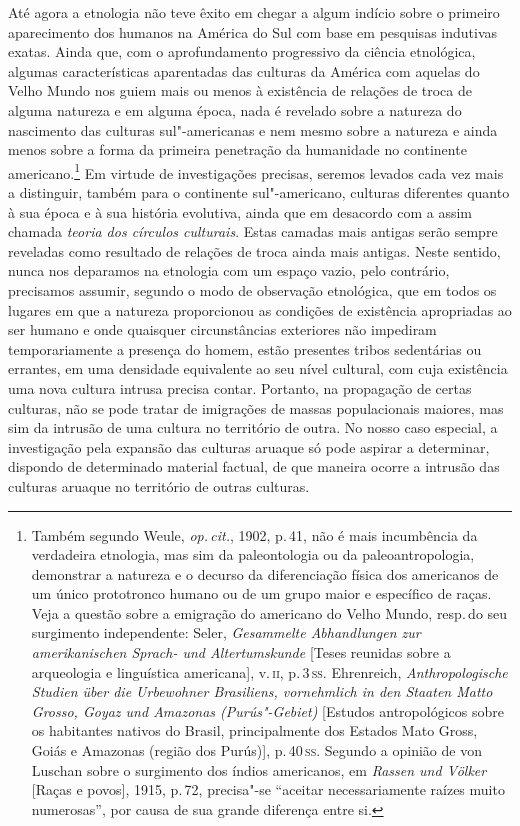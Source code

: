 Até agora a etnologia não teve êxito em chegar a algum indício sobre o
primeiro aparecimento dos humanos na América do Sul com base em
pesquisas indutivas exatas. Ainda que, com o aprofundamento progressivo
da ciência etnológica, algumas características aparentadas das culturas
da América com aquelas do Velho Mundo nos guiem mais ou menos à
existência de relações de troca de alguma natureza e em alguma época,
nada é revelado sobre a natureza do nascimento das
culturas sul"-americanas e nem mesmo sobre a natureza e ainda menos sobre
a forma da primeira penetração da humanidade no continente
americano.\footnote{Também segundo Weule, \textit{op.\,cit.}, 1902, p.\,41, não é mais incumbência
  da verdadeira etnologia, mas sim da paleontologia ou da
  paleoantropologia, demonstrar a natureza e o decurso da diferenciação
  física dos americanos de um único prototronco
  humano ou de um grupo maior e específico de raças.
  Veja a questão sobre a emigração do americano do Velho Mundo, resp.\,do
  seu surgimento independente: Seler, \textit{Gesammelte Abhandlungen zur
  amerikanischen Sprach- und Altertumskunde} {[}Teses reunidas sobre a
  arqueologia e linguística americana{]}, v.\,\textsc{ii}, p.\,3\,\textsc{ss}. Ehrenreich,
  \textit{Anthropologische Studien über die Urbewohner Brasiliens,
  vornehmlich in den Staaten Matto Grosso, Goyaz und Amazonas
  (Purús"-Gebiet)} {[}Estudos antropológicos sobre os habitantes nativos
  do Brasil, principalmente dos Estados Mato Gross, Goiás e Amazonas
  (região dos Purús){]}, p.\,40\,\textsc{ss}. Segundo a opinião de von Luschan
  sobre o surgimento dos índios americanos, em \textit{Rassen und Völker} {[}Raças e povos{]},
  1915, p.\,72, precisa"-se ``aceitar
  necessariamente raízes muito numerosas'', por causa de sua grande
  diferença entre si.} Em virtude de investigações precisas, seremos levados
cada vez mais a distinguir, também para o continente sul"-americano,
culturas diferentes quanto à sua época e à sua história evolutiva, ainda que em desacordo 
com a assim chamada \textit{teoria dos círculos
culturais}. Estas camadas mais antigas serão sempre reveladas como
resultado de relações de troca ainda mais antigas. Neste sentido, nunca nos deparamos na 
etnologia com um espaço vazio, pelo
contrário, precisamos assumir, segundo o modo de observação etnológica,
que em todos os lugares em que a natureza proporcionou as condições de
existência apropriadas ao ser humano e onde quaisquer circunstâncias
exteriores não impediram temporariamente a presença do homem, estão
presentes tribos sedentárias ou errantes, em uma densidade equivalente
ao seu nível cultural, com cuja existência uma nova cultura intrusa
precisa contar. Portanto, na propagação de certas culturas, não se pode
tratar de imigrações de massas populacionais maiores, mas sim da
intrusão de uma cultura no território de outra. No nosso caso especial,
a investigação pela expansão das culturas aruaque só pode aspirar a
determinar, dispondo de determinado material factual, de que maneira
ocorre a intrusão das culturas aruaque no território de outras
culturas.

